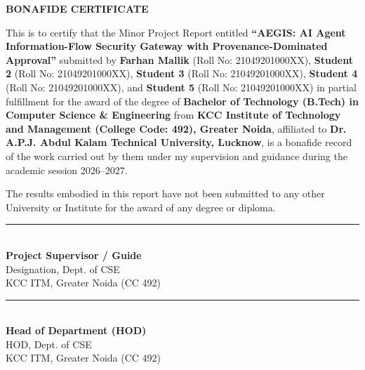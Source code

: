 \newpage
\thispagestyle{plain}
\begin{center}
{\Large \textbf{BONAFIDE CERTIFICATE}}\\[1.0cm]
\end{center}

\noindent This is to certify that the Minor Project Report entitled \textbf{``AEGIS: AI Agent Information-Flow Security Gateway with Provenance-Dominated Approval''} submitted by \textbf{Farhan Mallik} (Roll No: 21049201000XX), \textbf{Student 2} (Roll No: 21049201000XX), \textbf{Student 3} (Roll No: 21049201000XX), \textbf{Student 4} (Roll No: 21049201000XX), and \textbf{Student 5} (Roll No: 21049201000XX) in partial fulfillment for the award of the degree of \textbf{Bachelor of Technology (B.Tech) in Computer Science \& Engineering} from \textbf{KCC Institute of Technology and Management (College Code: 492), Greater Noida}, affiliated to \textbf{Dr. A.P.J. Abdul Kalam Technical University, Lucknow}, is a bonafide record of the work carried out by them under my supervision and guidance during the academic session 2026--2027.

\vspace{0.4cm}
\noindent The results embodied in this report have not been submitted to any other University or Institute for the award of any degree or diploma.

\vspace{3.5cm}

\noindent
\begin{minipage}{0.48\textwidth}
\begin{flushleft}
\rule{6cm}{0.4pt}\\
\textbf{Project Supervisor / Guide}\\
Designation, Dept. of CSE\\
KCC ITM, Greater Noida (CC 492)
\end{flushleft}
\end{minipage}
\hfill
\begin{minipage}{0.48\textwidth}
\begin{flushright}
\rule{6cm}{0.4pt}\\
\textbf{Head of Department (HOD)}\\
HOD, Dept. of CSE\\
KCC ITM, Greater Noida (CC 492)
\end{flushright}
\end{minipage}
